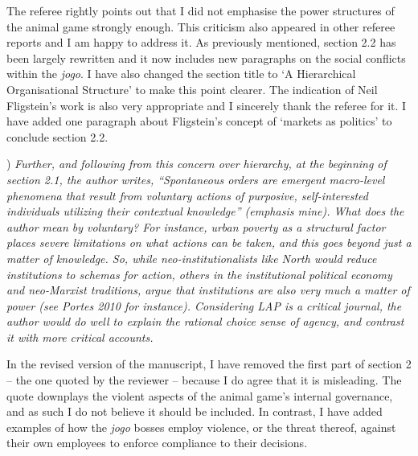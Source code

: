 \documentclass[a4paper,12pt]{article}
\begin{document}
\vspace{.25cm}

The referee rightly points out that I did not emphasise the power structures of the animal game strongly enough. This criticism also appeared in other referee reports and I am happy to address it. As previously mentioned, section 2.2 has been largely rewritten and it now includes new paragraphs on the social conflicts within the \textit{jogo}. I have also changed the section title to `A Hierarchical Organisational Structure' to make this point clearer. The indication of Neil Fligstein's work is also very appropriate and I sincerely thank the referee for it. I have added one paragraph about Fligstein's concept of `markets as politics' to conclude section 2.2.

\vspace{.5cm}

) \textit{Further, and following from this concern over hierarchy, at the beginning of section 2.1, the author writes, \emph{``Spontaneous orders are emergent macro-level phenomena that result from voluntary actions of purposive, self-interested individuals utilizing their contextual knowledge}'' (emphasis mine). What does the author mean by voluntary? For instance, urban poverty as a structural factor places severe limitations on what actions can be taken, and this goes beyond just a matter of knowledge. So, while neo-institutionalists like North would reduce institutions to schemas for action, others in the institutional political economy and neo-Marxist traditions, argue that institutions are also very much a matter of power (see Portes 2010 for instance). Considering LAP is a critical journal, the author would do well to explain the rational choice sense of agency, and contrast it with more critical accounts.}

\vspace{.25cm}

In the revised version of the manuscript, I have removed the first part of section 2 -- the one quoted by the reviewer -- because I do agree that it is misleading. The quote downplays the violent aspects of the animal game's internal governance, and as such I do not believe it should be included. In contrast, I have added examples of how the \textit{jogo} bosses employ violence, or the threat thereof, against their own employees to enforce compliance to their decisions. 
\end{document}
